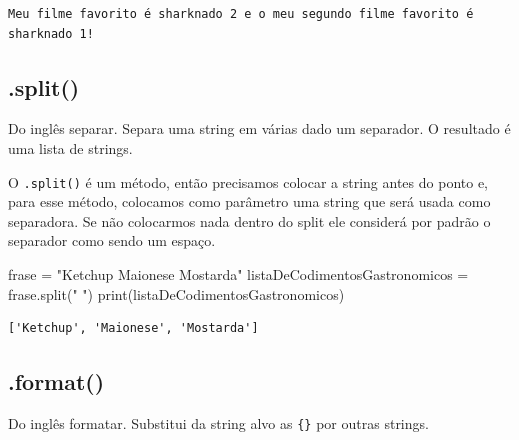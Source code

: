 \documentclass[
  letterpaper,
  DIV=11,
  numbers=noendperiod]{scrreprt}
\newenvironment{Shaded}{\begin{snugshade}}{\end{snugshade}}
\newcommand{\BuiltInTok}[1]{\textcolor[rgb]{0.00,0.23,0.31}{#1}}
\newcommand{\NormalTok}[1]{\textcolor[rgb]{0.00,0.23,0.31}{#1}}
\newcommand{\OperatorTok}[1]{\textcolor[rgb]{0.37,0.37,0.37}{#1}}
\newcommand{\StringTok}[1]{\textcolor[rgb]{0.13,0.47,0.30}{#1}}
\begin{document}
\begin{tcolorbox}[enhanced jigsaw, breakable, leftrule=.75mm, left=2mm, opacityback=0, bottomrule=.15mm, toprule=.15mm, rightrule=.15mm, arc=.35mm, colback=white]

\begin{verbatim}
Meu filme favorito é sharknado 2 e o meu segundo filme favorito é sharknado 1!
\end{verbatim}

\end{tcolorbox}

\hypertarget{split}{%
\subsection{.split()}\label{split}}

Do inglês separar. Separa uma string em várias dado um separador. O
resultado é uma lista de strings.

O \texttt{.split()} é um método, então precisamos colocar a string antes
do ponto e, para esse método, colocamos como parâmetro uma string que
será usada como separadora. Se não colocarmos nada dentro do split ele
considerá por padrão o separador como sendo um espaço.

\begin{Shaded}
\begin{Highlighting}[]
\NormalTok{frase }\OperatorTok{=} \StringTok{"Ketchup Maionese Mostarda"}
\NormalTok{listaDeCodimentosGastronomicos }\OperatorTok{=}\NormalTok{ frase.split(}\StringTok{" "}\NormalTok{)}
\BuiltInTok{print}\NormalTok{(listaDeCodimentosGastronomicos)}
\end{Highlighting}
\end{Shaded}

\begin{tcolorbox}[enhanced jigsaw, breakable, leftrule=.75mm, left=2mm, opacityback=0, bottomrule=.15mm, toprule=.15mm, rightrule=.15mm, arc=.35mm, colback=white]

\begin{verbatim}
['Ketchup', 'Maionese', 'Mostarda']
\end{verbatim}

\end{tcolorbox}

\hypertarget{format}{%
\subsection{.format()}\label{format}}

Do inglês formatar. Substitui da string alvo as \texttt{\{\}} por outras
strings.
\end{document}
